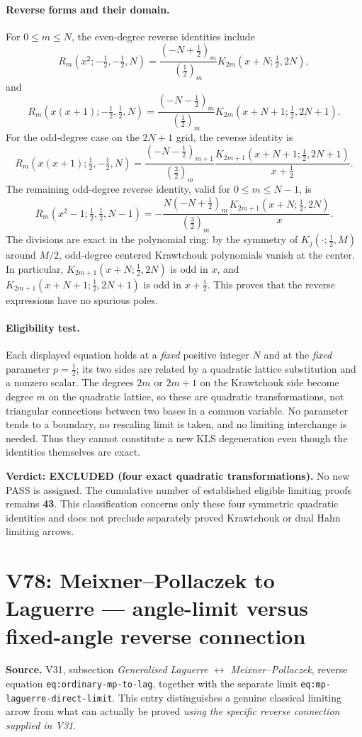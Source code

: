 \documentclass[11pt]{article}
\begin{document}
\paragraph{Reverse forms and their domain.}
For $0\le m\le N$, the even-degree reverse identities include
\[
 R_m(x^2;-\tfrac12,-\tfrac12,N)
 =\frac{(-N+\tfrac12)_m}{(\tfrac12)_m}
 K_{2m}(x+N;\tfrac12,2N),
\]
and
\[
 R_m(x(x+1);-\tfrac12,\tfrac12,N)
 =\frac{(-N-\tfrac12)_m}{(\tfrac12)_m}
 K_{2m}(x+N+1;\tfrac12,2N+1).
\]
For the odd-degree case on the $2N+1$ grid, the reverse identity is
\[
 R_m(x(x+1);\tfrac12,-\tfrac12,N)
 =\frac{(-N-\tfrac12)_{m+1}}{(\tfrac32)_m}
 \frac{K_{2m+1}(x+N+1;\tfrac12,2N+1)}{x+\tfrac12}.
\]
The remaining odd-degree reverse identity, valid for $0\le m\le N-1$,
is
\[
 R_m(x^2-1;\tfrac12,\tfrac12,N-1)
 =-\frac{N(-N+\tfrac12)_m}{(\tfrac32)_m}
 \frac{K_{2m+1}(x+N;\tfrac12,2N)}{x}.
\]
The divisions are exact in the polynomial ring: by the symmetry of
$K_j(\cdot;\tfrac12,M)$ around $M/2$, odd-degree centered
Krawtchouk polynomials vanish at the center.  In particular,
$K_{2m+1}(x+N;\tfrac12,2N)$ is odd in $x$, and
$K_{2m+1}(x+N+1;\tfrac12,2N+1)$ is odd in $x+\tfrac12$.
This proves that the reverse expressions have no spurious poles.

\paragraph{Eligibility test.}
Each displayed equation holds at a \emph{fixed} positive integer $N$
and at the \emph{fixed} parameter $p=\tfrac12$; its two sides are
related by a quadratic lattice substitution and a nonzero scalar.
The degrees $2m$ or $2m+1$ on the Krawtchouk side become degree $m$
on the quadratic lattice, so these are quadratic transformations,
not triangular connections between two bases in a common variable.
No parameter tends to a boundary, no rescaling limit is taken, and
no limiting interchange is needed.  Thus they cannot constitute a
new KLS degeneration even though the identities themselves are exact.

\noindent\textbf{Verdict: EXCLUDED (four exact quadratic transformations).}
No new PASS is assigned.  The cumulative number of established
eligible limiting proofs remains \textbf{43}.  This classification
concerns only these four symmetric quadratic identities and does not
preclude separately proved Krawtchouk or dual Hahn limiting arrows.


\section{V78: Meixner--Pollaczek to Laguerre --- angle-limit versus fixed-angle reverse connection}
\noindent\textbf{Source.} V31, subsection \emph{Generalised Laguerre
$\leftrightarrow$ Meixner--Pollaczek}, reverse equation
\texttt{eq:ordinary-mp-to-lag}, together with the separate limit
\texttt{eq:mp-laguerre-direct-limit}.  This entry distinguishes a genuine
classical limiting arrow from what can actually be proved \emph{using the
specific reverse connection supplied in V31}.
\end{document}
